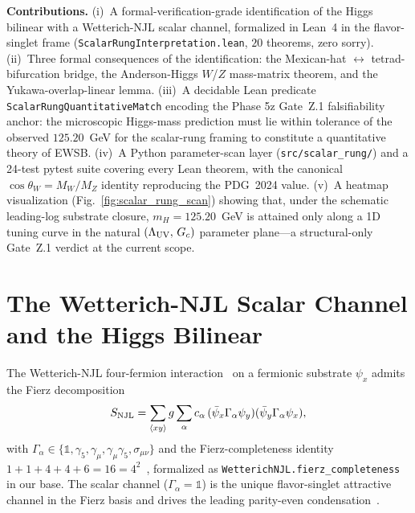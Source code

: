 \documentclass[aps,prd,twocolumn,showpacs,superscriptaddress,nofootinbib]{revtex4-2}
\begin{document}
\textbf{Contributions.} (i)~A formal-verification-grade identification of
the Higgs bilinear with a Wetterich-NJL scalar channel,
formalized in Lean~4 in the flavor-singlet frame
(\texttt{ScalarRungInterpretation.lean}, $20$ theorems, zero sorry).
(ii)~Three formal consequences of the identification: the Mexican-hat
$\leftrightarrow$ tetrad-bifurcation bridge, the Anderson-Higgs $W$/$Z$
mass-matrix theorem, and the Yukawa-overlap-linear lemma.
(iii)~A decidable Lean predicate
\texttt{ScalarRungQuantitativeMatch} encoding the Phase 5z Gate~Z.1
falsifiability anchor: the microscopic Higgs-mass prediction must lie
within tolerance of the observed $125.20$~GeV for the scalar-rung framing
to constitute a quantitative theory of EWSB.
(iv)~A Python parameter-scan layer
(\texttt{src/scalar\_rung/}) and a 24-test pytest suite covering every
Lean theorem, with the canonical
$\cos\theta_W = M_W/M_Z$ identity reproducing the PDG~2024 value.
(v)~A heatmap visualization
(Fig.~\ref{fig:scalar_rung_scan}) showing that, under the schematic
leading-log substrate closure, $m_H = 125.20$~GeV is attained only along
a 1D tuning curve in the natural $(\Lambda_{\rm UV},\,G_c)$ parameter
plane---a structural-only Gate~Z.1 verdict at the current scope.

\section{The Wetterich-NJL Scalar Channel and the Higgs Bilinear}
\label{sec:scalar-channel}

The Wetterich-NJL four-fermion interaction~\cite{WetterichNJL} on a
fermionic substrate $\psi_x$ admits the Fierz decomposition
\begin{equation}
\label{eq:njl}
S_{\rm NJL} = \sum_{\langle xy\rangle} g \sum_\alpha c_\alpha\,
(\bar\psi_x \Gamma_\alpha \psi_y)(\bar\psi_y \Gamma_\alpha \psi_x),
\end{equation}
with $\Gamma_\alpha\in\{\mathbb{1},\gamma_5,\gamma_\mu,\gamma_\mu\gamma_5,
\sigma_{\mu\nu}\}$ and the Fierz-completeness identity
$1 + 1 + 4 + 4 + 6 = 16 = 4^2$~\cite{Fierz}, formalized as
\texttt{WetterichNJL.fierz\_completeness} in our base. The scalar channel
($\Gamma_\alpha = \mathbb{1}$) is the unique flavor-singlet attractive
channel in the Fierz basis and drives the leading parity-even
condensation~\cite{NJL61}.
\end{document}
